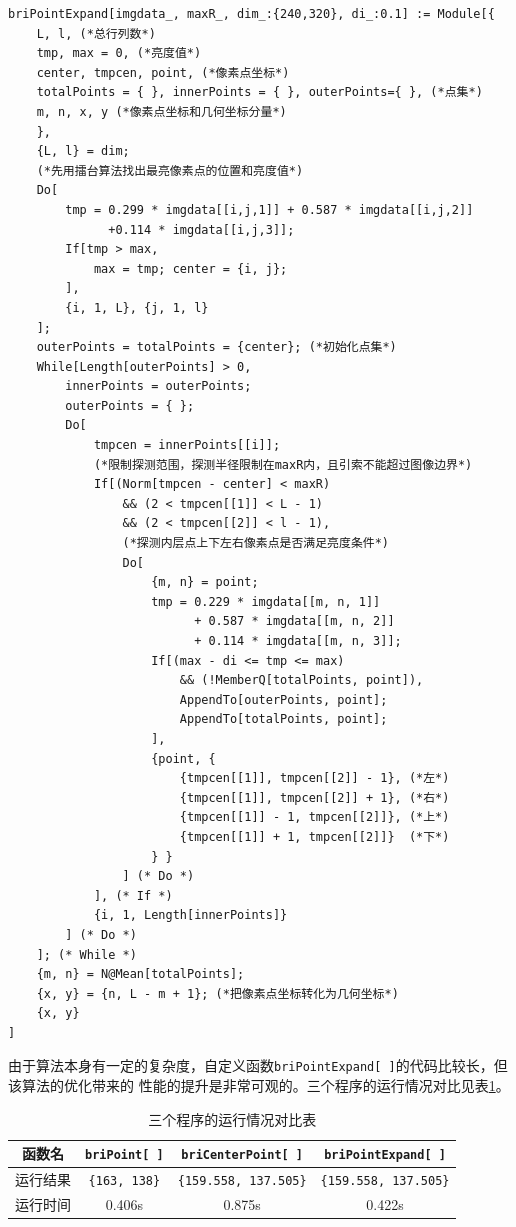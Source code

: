 \documentclass[UTF8,a4paper,12pt]{article}
\begin{document}
\begin{verbatim}
briPointExpand[imgdata_, maxR_, dim_:{240,320}, di_:0.1] := Module[{
    L, l, (*总行列数*)
    tmp, max = 0, (*亮度值*)
    center, tmpcen, point, (*像素点坐标*)
    totalPoints = { }, innerPoints = { }, outerPoints={ }, (*点集*)
    m, n, x, y (*像素点坐标和几何坐标分量*)
    },
    {L, l} = dim;
    (*先用擂台算法找出最亮像素点的位置和亮度值*)
    Do[ 
        tmp = 0.299 * imgdata[[i,j,1]] + 0.587 * imgdata[[i,j,2]]
              +0.114 * imgdata[[i,j,3]];
        If[tmp > max,
            max = tmp; center = {i, j};
        ],
        {i, 1, L}, {j, 1, l}
    ];
    outerPoints = totalPoints = {center}; (*初始化点集*)
    While[Length[outerPoints] > 0,
        innerPoints = outerPoints;
        outerPoints = { };
        Do[
            tmpcen = innerPoints[[i]];
            (*限制探测范围，探测半径限制在maxR内，且引索不能超过图像边界*)
            If[(Norm[tmpcen - center] < maxR) 
                && (2 < tmpcen[[1]] < L - 1) 
                && (2 < tmpcen[[2]] < l - 1),
                (*探测内层点上下左右像素点是否满足亮度条件*)
                Do[
                    {m, n} = point;
                    tmp = 0.229 * imgdata[[m, n, 1]] 
                          + 0.587 * imgdata[[m, n, 2]]
                          + 0.114 * imgdata[[m, n, 3]];
                    If[(max - di <= tmp <= max) 
                        && (!MemberQ[totalPoints, point]),
                        AppendTo[outerPoints, point]; 
                        AppendTo[totalPoints, point];
                    ],
                    {point, {
                        {tmpcen[[1]], tmpcen[[2]] - 1}, (*左*)
                        {tmpcen[[1]], tmpcen[[2]] + 1}, (*右*)
                        {tmpcen[[1]] - 1, tmpcen[[2]]}, (*上*)
                        {tmpcen[[1]] + 1, tmpcen[[2]]}  (*下*)
                    } }
                ] (* Do *)
            ], (* If *)
            {i, 1, Length[innerPoints]}
        ] (* Do *)
    ]; (* While *)
    {m, n} = N@Mean[totalPoints];
    {x, y} = {n, L - m + 1}; (*把像素点坐标转化为几何坐标*)
    {x, y}
]
\end{verbatim}

由于算法本身有一定的复杂度，自定义函数\verb|briPointExpand[ ]|的代码比较长，但该算法的优化带来的
性能的提升是非常可观的。三个程序的运行情况对比见表\;\ref{tab:result}。

\begin{table}[htbp]
\centering
\caption{三个程序的运行情况对比表}\label{tab:result}
\begin{tabular}{|c|c|c|c|}\hline
函数名   & \verb|briPoint[ ]| & \verb|briCenterPoint[ ]|  & \verb|briPointExpand[ ]| \\\hline
运行结果 & \verb|{163, 138}|  & \verb|{159.558, 137.505}| & \verb|{159.558, 137.505}|\\\hline
运行时间 & 0.406s             & 0.875s                    & 0.422s   \\\hline
\end{tabular}
\end{table}
\end{document}
